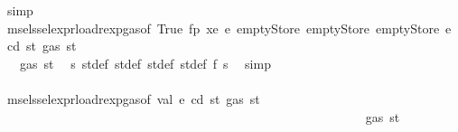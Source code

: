 \begin{isabellebody}
\ simp\isanewline
\ \ \ \ \ \ \ \ \ \ \ \ \ \ \ \ \ \ \ \ \ \ \ \ \ \ \ \ \ \ \ \ \ \ \ \ \ \ \ \ \ \ \ \ \ \ \ \ \ \ \ \ \isamarkupfalse%
\ \isamarkupfalse%
\ msel{\isacharunderscore}{\kern0pt}ssel{\isacharunderscore}{\kern0pt}expr{\isacharunderscore}{\kern0pt}load{\isacharunderscore}{\kern0pt}rexp{\isacharunderscore}{\kern0pt}gas{\isacharparenleft}{\kern0pt}{}{\isacharparenright}{\kern0pt}{\isacharbrackleft}{\kern0pt}of\ True\ fp\ xe\ e{\isacharprime}{\kern0pt}\ emptyStore\ emptyStore\ emptyStore\ e\ cd\ st{\isacharprime}{\kern0pt}{\isacharprime}{\kern0pt}{\isacharprime}{\kern0pt}\ {\isachardoublequoteopen}gas\ st{\isacharprime}{\kern0pt}{\isacharprime}{\kern0pt}{\isacharprime}{\kern0pt}{\isachardoublequoteclose}{\isacharbrackright}{\kern0pt}\isanewline
\ \ \ \ \ \ \ \ \ \ \ \ \ \ \ \ \ \ \ \ \ \ \ \ \ \ \ \ \ \ \ \ \ \ \ \ \ \ \ \ \ \ \ \ \ \ \ \ \ \ \ \ \ \ \isamarkupfalse%
\ {\isachardoublequoteopen}{\isasymdots}\ {\isasymle}\ gas\ st{\isacharprime}{\kern0pt}{\isacharprime}{\kern0pt}{\isacharprime}{\kern0pt}{\isachardoublequoteclose}\ \isamarkupfalse%
\ s{}\ st{\isacharprime}{\kern0pt}{\isacharunderscore}{\kern0pt}def\ st{\isacharprime}{\kern0pt}{\isacharprime}{\kern0pt}{\isacharunderscore}{\kern0pt}def\ st{\isacharprime}{\kern0pt}{\isacharprime}{\kern0pt}{\isacharprime}{\kern0pt}{\isacharunderscore}{\kern0pt}def\ st{\isacharprime}{\kern0pt}{\isacharprime}{\kern0pt}{\isacharprime}{\kern0pt}{\isacharprime}{\kern0pt}{\isacharunderscore}{\kern0pt}def\ f{}\ s{}\ \isamarkupfalse%
\ simp\isanewline
\ \ \ \ \ \ \ \ \ \ \ \ \ \ \ \ \ \ \ \ \ \ \ \ \ \ \ \ \ \ \ \ \ \ \ \ \ \ \ \ \ \ \ \ \ \ \ \ \ \ \ \ \isamarkupfalse%
\ \isamarkupfalse%
\ msel{\isacharunderscore}{\kern0pt}ssel{\isacharunderscore}{\kern0pt}expr{\isacharunderscore}{\kern0pt}load{\isacharunderscore}{\kern0pt}rexp{\isacharunderscore}{\kern0pt}gas{\isacharparenleft}{\kern0pt}{}{\isacharparenright}{\kern0pt}{\isacharbrackleft}{\kern0pt}of\ val\ e\ cd\ st{\isacharprime}{\kern0pt}{\isacharprime}{\kern0pt}\ {\isachardoublequoteopen}gas\ st{\isacharprime}{\kern0pt}{\isacharprime}{\kern0pt}{\isachardoublequoteclose}{\isacharbrackright}{\kern0pt}\isanewline
\ \ \ \ \ \ \ \ \ \ \ \ \ \ \ \ \ \ \ \ \ \ \ \ \ \ \ \ \ \ \ \ \ \ \ \ \ \ \ \ \ \ \ \ \ \ \ \ \ \ \ \ \ \ \isamarkupfalse%
\ {\isachardoublequoteopen}{\isasymdots}\ {\isasymle}\ gas\ st{\isacharprime}{\kern0pt}{\isacharprime}{\kern0pt}{\isachardoublequoteclose}\ \isamarkupfalse%

\end{isabellebody}
